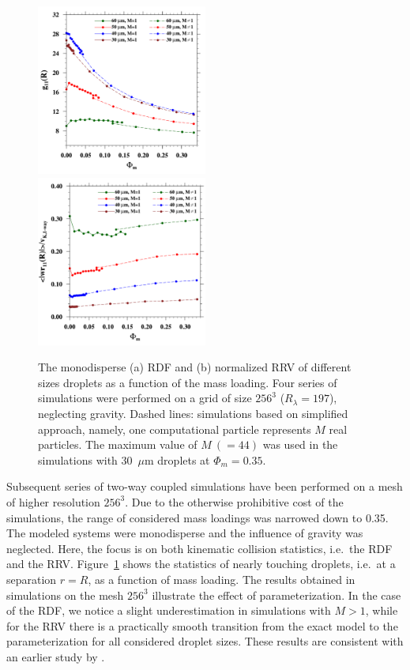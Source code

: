 \documentclass[../thesis.tex]{subfiles}
\begin{document}
\begin{figure}[h!]%
\includegraphics[width=0.5\textwidth]{./figs/IJMF/Figure3a.pdf}
\includegraphics[width=0.5\textwidth]{./figs/IJMF/Figure3b.pdf}
\caption{The monodisperse (a) RDF and (b) normalized RRV of different sizes droplets as a function of the mass loading. Four series of simulations were performed on a grid of size $256^3$ ($R_{\lambda}=197$), neglecting gravity. Dashed lines: simulations based on simplified approach, namely, one computational particle represents $M$ real particles. The maximum value of $M~(=44)$ was used in the simulations with 30~$\mu$m droplets at $\Phi_m = 0.35$.}
\label{fig3}
\end{figure}%

Subsequent series of two-way coupled simulations have been performed on a mesh of higher resolution $256^3$. Due to the otherwise prohibitive cost of the simulations, the range of considered mass loadings was narrowed down to 0.35. The modeled systems were monodisperse and the influence of gravity was neglected. Here, the focus is on both kinematic collision statistics, i.e.\ the RDF and the RRV. Figure~\ref{fig3} shows the statistics of nearly touching droplets, i.e.\ at a separation $r = R$, as a function of mass loading. The results obtained in simulations on the mesh $256^3$ illustrate the effect of parameterization. In the case of the RDF, we notice a slight underestimation in simulations with $M>1$, while for the RRV there is a practically smooth transition from the exact model to the parameterization for all considered droplet sizes. These results are consistent with an earlier study by \cite{RPW20}.
\end{document}
